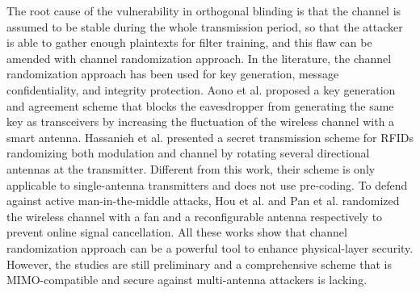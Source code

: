 The root cause of the vulnerability in orthogonal blinding is that the channel is assumed to be stable during the whole transmission period, so that the attacker is able to gather enough plaintexts for filter training, and this flaw can be amended with channel randomization approach.
In the literature, the channel randomization approach has been used for key generation, message confidentiality, and integrity protection. Aono et al. \cite{aono2005wireless} proposed a key generation and agreement scheme that blocks the eavesdropper from generating the same key as transceivers by increasing the fluctuation of the wireless channel with a smart antenna. Hassanieh et al. \cite{hassanieh2015securing} presented a secret transmission scheme for RFIDs randomizing both modulation and channel by rotating several directional antennas at the transmitter. Different from this work, their scheme is only applicable to single-antenna transmitters and does not use pre-coding. To defend against active man-in-the-middle attacks, Hou et al. \cite{hou2015message} and Pan et al. \cite{pan2017message} randomized the wireless channel with a fan and a reconfigurable antenna respectively to prevent  online  signal cancellation.  All these works show that channel randomization approach can be a powerful tool to enhance physical-layer security. However, the studies are still preliminary and a comprehensive scheme that is MIMO-compatible and secure against multi-antenna attackers is lacking. 
